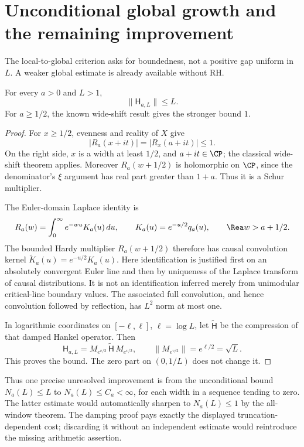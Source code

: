 \section{Unconditional global growth and the remaining improvement}
The local-to-global criterion asks for boundedness, not a positive gap uniform in $L$. A weaker global estimate is already available without RH.
\begin{proposition}\label{prop:globalgrowth}
For every $a>0$ and $L>1$,
\[
 \|\mathsf H_{a,L}\|\leq L.
\]
For $a\geq1/2$, the known wide-shift result gives the stronger bound $1$.
\end{proposition}
\begin{proof}
For $x\geq1/2$, evenness and reality of $X$ give
\[
 |R_a(x+it)|=|R_x(a+it)|\leq1.
\]
On the right side, $x$ is a width at least $1/2$, and $a+it\in\CP$; the classical wide-shift theorem applies. Moreover $R_a(w+1/2)$ is holomorphic on $\CP$, since the denominator's $\xi$ argument has real part greater than $1+a$. Thus it is a Schur multiplier.

The Euler-domain Laplace identity is
\[
 R_a(w)=\int_0^\infty e^{-wu}K_a(u)\,du,
 \qquad K_a(u)=e^{-u/2}q_a(u),\qquad \Rea w>a+1/2.
\]
The bounded Hardy multiplier $R_a(w+1/2)$ therefore has causal convolution kernel $\widetilde K_a(u)=e^{-u/2}K_a(u)$. Here identification is justified first on an absolutely convergent Euler line and then by uniqueness of the Laplace transform of causal distributions. It is not an identification inferred merely from unimodular critical-line boundary values. The associated full convolution, and hence convolution followed by reflection, has $L^2$ norm at most one.

In logarithmic coordinates on $[-\ell,\ell]$, $\ell=\log L$, let $\widetilde{\mathsf H}$ be the compression of that damped Hankel operator. Then
\[
 \mathsf H_{a,L}=M_{e^{v/2}}\,\widetilde{\mathsf H}\,M_{e^{v/2}},
 \qquad \|M_{e^{v/2}}\|=e^{\ell/2}=\sqrt L.
\]
This proves the bound. The zero part on $(0,1/L)$ does not change it.
\end{proof}
Thus one precise unresolved improvement is from the unconditional bound $N_a(L)\leq L$ to $N_a(L)\leq C_a<\infty$, for each width in a sequence tending to zero. The latter estimate would automatically sharpen to $N_a(L)\leq1$ by the all-window theorem. The damping proof pays exactly the displayed truncation-dependent cost; discarding it without an independent estimate would reintroduce the missing arithmetic assertion.

